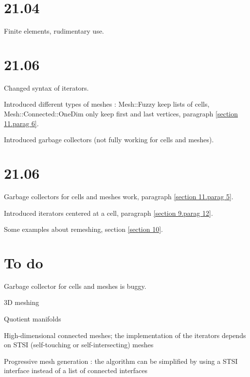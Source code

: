 \documentclass[a4paper]{scrreprt}
\def\manifemrelease{21.06}
\def\numb{}
\newcommand\verm[1]{\textcolor{manif}{#1}}
\renewcommand\tt{\normalfont\ttfamily}
\begin{document}



\section*{21.04}

\noindent Finite elements, rudimentary use.


\section*{21.06}

\noindent Changed syntax of iterators.

\noindent Introduced different types of meshes :
{\small\tt\verm{Mesh}::Fuzzy} keep lists of cells,
{\small\tt\verm{Mesh}::Connected::OneDim} only keep first and last vertices,
paragraph \ref{\numb section 11.\numb parag 6}.

\noindent Introduced garbage collectors (not fully working for cells and meshes).


\section*{\manifemrelease}

\noindent Garbage collectors for cells and meshes work,
paragraph \ref{\numb section 11.\numb parag 5}.

\noindent Introduced iterators centered at a cell,
paragraph \ref{\numb section 9.\numb parag 12}.

\noindent Some examples about remeshing, section \ref{\numb section 10}.


\section*{To do}

\noindent Garbage collector for cells and meshes is buggy.

\noindent 3D meshing

\noindent Quotient manifolds

\noindent High-dimensional connected meshes; the implementation of the iterators depends
on STSI (self-touching or self-intersecting) meshes

\noindent Progressive mesh generation : the algorithm can be simplified by using
a STSI interface instead of a list of connected interfaces
\end{document}

